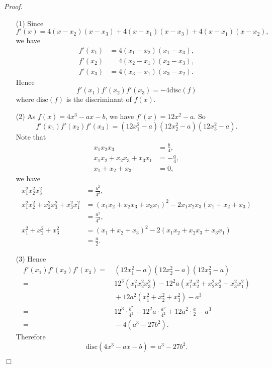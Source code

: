 \documentclass{article}
\begin{document}
\emph{Proof.}
\begin{enumerate}
\item[(1)]
  Since
  \[
    f'(x) = 4(x-x_2)(x-x_3) + 4(x-x_1)(x-x_3) + 4(x-x_1)(x-x_2),
  \]
  we have
  \begin{align*}
    f'(x_1) &= 4(x_1-x_2)(x_1-x_3), \\
    f'(x_2) &= 4(x_2-x_1)(x_2-x_3), \\
    f'(x_3) &= 4(x_3-x_1)(x_3-x_2).
  \end{align*}
  Hence
  \[
    f'(x_1)f'(x_2)f'(x_3) = -4 \mathrm{disc}(f)
  \]
  where $\mathrm{disc}(f)$ is the discriminant of $f(x)$.

\item[(2)]
  As $f(x) = 4x^3 - ax - b$, we have $f'(x) = 12x^2 - a$.
  So
  \[
    f'(x_1)f'(x_2)f'(x_3) = (12x_1^2 - a)(12x_2^2 - a)(12x_3^2 - a).
  \]
  Note that
  \begin{align*}
    x_1 x_2 x_3 &= \frac{b}{4}, \\
    x_1 x_2 + x_2 x_3 + x_3 x_1 &= -\frac{a}{4}, \\
    x_1 + x_2 + x_3 &= 0,
  \end{align*}
  we have
  \begin{align*}
    x_1^2 x_2^2 x_3^2
    &= \frac{b^2}{4^2}, \\
    x_1^2 x_2^2 + x_2^2 x_3^2 + x_3^2 x_1^2
    &= (x_1 x_2 + x_2 x_3 + x_3 x_1)^2 - 2 x_1 x_2 x_3(x_1 + x_2 + x_3) \\
    &= \frac{a^2}{4^2}, \\
    x_1^2 + x_2^2 + x_3^2
    &= (x_1 + x_2 + x_3)^2 - 2(x_1 x_2 + x_2 x_3 + x_3 x_1) \\
    &= \frac{a}{2}.
  \end{align*}

\item[(3)]
  Hence
  \begin{align*}
    f'(x_1)f'(x_2)f'(x_3)
    =&\: (12x_1^2 - a)(12x_2^2 - a)(12x_3^2 - a) \\
    =&\: 12^3 (x_1^2 x_2^2 x_3^2) - 12^2 a(x_1^2 x_2^2 + x_2^2 x_3^2 + x_3^2 x_1^2) \\
      &\: + 12 a^2(x_1^2 + x_2^2 + x_3^2) - a^3 \\
    =&\: 12^3 \cdot \frac{b^2}{4^2} - 12^2 a \cdot \frac{a^2}{4^2}
      + 12 a^2 \cdot \frac{a}{2} - a^3 \\
    =&\: -4(a^3 - 27b^2).
  \end{align*}
  Therefore
  \[
    \mathrm{disc}(4x^3 - ax - b) = a^3 - 27b^2.
  \]
\end{enumerate}
$\Box$ \\\\
\end{document}
